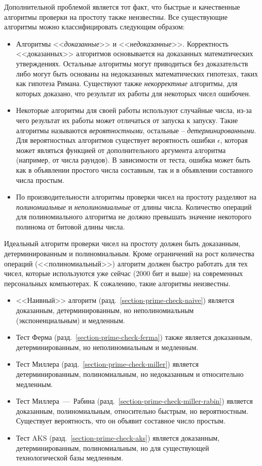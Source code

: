 Дополнительной проблемой является тот факт, что быстрые и качественные алгоритмы проверки на простоту также неизвестны. Все существующие алгоритмы можно классифицировать следующим образом:
\begin{itemize}
	\item Алгоритмы <<\emph{доказанные}>> и <<\emph{недоказанные}>>. Корректность <<доказанных>> алгоритмов основывается на доказанных математических утверждениях. Остальные алгоритмы могут приводиться без доказательств либо могут быть основаны на недоказанных математических гипотезах, таких как гипотеза Римана. Существуют также \emph{некорректные} алгоритмы, для которых доказано, что результат их работы для некоторых чисел ошибочен.
	\item Некоторые алгоритмы для своей работы используют случайные числа, из-за чего результат их работы может отличаться от запуска к запуску. Такие алгоритмы называются \emph{вероятностными}, остальные -- \emph{детерминированными}. Для вероятностных алгоритмов существует вероятность ошибки $\epsilon$, которая может являться функцией от дополнительного аргумента алгоритма (например, от числа раундов). В зависимости от теста, ошибка может быть как в объявлении простого числа составным, так и в объявлении составного числа простым.
	\item По производительности алгоритмы проверки чисел на простоту разделяют на \emph{полиномиальные} и \emph{неполиномиальные} от длины числа. Количество операций для полиномиального алгоритма не должно превышать значение некоторого полинома от битовой длины числа.
\end{itemize}

Идеальный алгоритм проверки чисел на простоту должен быть доказанным, детерминированным и полиномиальным. Кроме ограничений на рост количества операций (<<полиномиальный>>) алгоритм должен быстро работать для тех чисел, которые используются уже сейчас (2000 бит и выше) на современных персональных компьютерах. К сожалению, такие алгоритмы неизвестны.

\begin{itemize}
	\item <<Наивный>> алгоритм (разд.~\ref{section-prime-check-naive}) является доказанным, детерминированным, но неполиномиальным (экспоненциальным) и медленным.
	\item Тест Ферма (разд.~\ref{section-prime-check-ferma}) также является доказанным, детерминированным, но неполиномиальным и медленным.
	\item Тест Миллера (разд.~\ref{section-prime-check-miller}) является детерминированным, полиномиальным, но недоказанным и относительно медленным.
	\item Тест Миллера~---~Рабина (разд.~\ref{section-prime-check-miller-rabin}) является доказанным, полиномиальным, относительно быстрым, но вероятностным. Существует вероятность, что он объявит составное число простым.
	\item Тест AKS (разд.~\ref{section-prime-check-aks}) является доказанным, детерминированным, полиномиальным, но для существующей технологической базы медленным.
\end{itemize}

